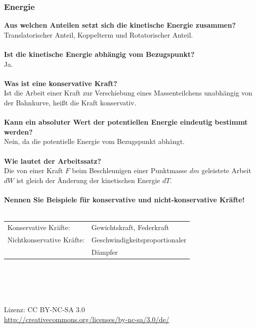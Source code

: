 \documentclass[a4paper,twocolumn,10pt]{article}
\begin{document}
\subsubsection{Energie}
\textbf{Aus welchen Anteilen setzt sich die kinetische Energie zusammen?}\\
Translatorischer Anteil, Koppelterm und Rotatorischer Anteil.\\\\
\textbf{Ist die kinetische Energie abhängig vom Bezugspunkt?}\\
Ja.\\\\
\textbf{Was ist eine konservative Kraft?}\\
Ist die Arbeit einer Kraft zur Verschiebung eines Massenteilchens unabhängig von der Bahnkurve, heißt die Kraft konservativ.\\\\
\textbf{Kann ein absoluter Wert der potentiellen Energie eindeutig bestimmt werden?}\\
Nein, da die potentielle Energie vom Bezugspunkt abhängt.\\\\
\textbf{Wie lautet der Arbeitssatz?}\\
Die von einer Kraft $F$ beim Beschleunigen einer Punktmasse $dm$ geleistete Arbeit $dW$ ist gleich der Änderung der kinetischen Energie $dT$.\\\\
\textbf{Nennen Sie Beispiele für konservative und nicht-konservative Kräfte!}\\\\
\begin{tabular}{ll}
Konservative Kräfte: & Gewichtskraft, Federkraft\\
Nichtkonservative Kräfte: &Geschwindigkeitsproportionaler\\
& Dämpfer
\end{tabular}
\\\\\\\\
Lizenz: CC BY-NC-SA 3.0\\
\url{http://creativecommons.org/licenses/by-nc-sa/3.0/de/}
\end{document}

